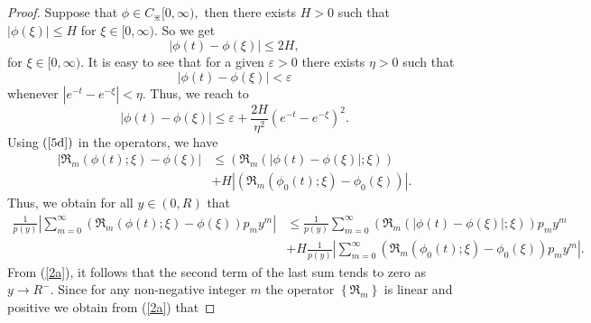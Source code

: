 \documentclass{amsart}
\theoremstyle{plain}
\numberwithin{equation}{section}
\begin{document}
\begin{proof}
Suppose that $\phi \in C_{\divideontimes}[0,\infty),$ then there exists
$H>0$ such that $\left \vert \phi(\xi)\right \vert \leq H$ for $\xi \in
\lbrack0,\infty).$ So we get%
\begin{equation}
\left \vert \phi \left(  t\right)  -\phi \left(  \xi \right)  \right \vert \leq2H,
\label{2b}%
\end{equation}
for $\xi \in \lbrack0,\infty).$ It is easy to see that for a given
$\varepsilon>0$ there exists $\eta>0$ such that
\[
\left \vert \phi \left(  t\right)  -\phi \left(  \xi \right)  \right \vert
<\varepsilon
\]
whenever $\left \vert e^{-t}-e^{-\xi}\right \vert <\eta$. Thus, we reach to%
\begin{equation}
\left \vert \phi \left(  t\right)  -\phi \left(  \xi \right)  \right \vert
\leq \varepsilon+\frac{2H}{\eta^{2}}\left(  e^{-t}-e^{-\xi}\right)  ^{2}.
\label{5d}%
\end{equation}
Using $\left(
\ref{5d}\right)  $ in the operators, we have
\begin{align}
\left \vert \Re_{m}\left(  \phi \left(  t\right)  ;\xi \right)  -\phi \left(
\xi \right)  \right \vert  &  \leq \left(  \Re_{m}\left(  \left \vert \phi \left(
t\right)  -\phi \left(  \xi \right)  \right \vert ;\xi \right)  \right)
\label{5d1}\\
&  +H\left \vert \left(  \Re_{m}\left(  \phi_0(t);\xi \right)  -\phi_0(\xi)\right)  \right \vert
.\nonumber
\end{align}
Thus, we obtain for all $y\in(0,R)$ that
\begin{align*}
\frac{1}{p(y)}\left \vert \sum \limits_{m=0}^{\infty}\left(  \Re_{m}\left(
\phi \left(  t\right)  ;\xi \right)  -\phi \left(  \xi \right)  \right)
p_{m}y^{m}\right \vert  &  \leq \frac{1}{p(y)}\sum \limits_{m=0}^{\infty}\left(
\Re_{m}\left(  \left \vert \phi \left(  t\right)  -\phi \left(  \xi \right)
\right \vert ;\xi \right)  \right)  p_{m}y^{m}\\
&  +H\frac{1}{p(y)}\left \vert \sum \limits_{m=0}^{\infty}\left(  \Re_{m}\left(
\phi_{0}(t);\xi \right)  -\phi_{0}(\xi) \right)  p_{m}y^{m}\right \vert.
\end{align*}
From (\ref{2a}), it follows that the second term of the last sum tends to zero as $y \to R^-$.
Since for any non-negative integer $m$ the operator $\left \{  \Re_{m}\right \}  $  is linear and positive  we obtain from (\ref{2a}) that

\end{proof}
\end{document}
